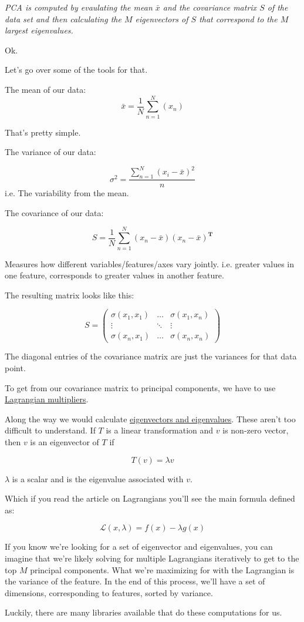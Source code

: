\documentclass[letterpaper,12pt]{article}
\begin{document}
\emph{PCA is computed by evaulating the mean $\bar{x}$ and the
covariance matrix $S$ of the data set and then calculating the $M$ eigenvectors
of $S$ that correspond to the $M$ largest eigenvalues.}

Ok.

Let's go over some of the tools for that.

The mean of our data:
\[
    \bar{x} = \frac{1}{N}\sum_{n=1}^{N}(x_n)
\]

That's pretty simple.

The variance of our data:

\[
    \sigma^2 = \frac{\sum_{n=1}^{N} (x_i - \bar{x})^2}{n}
\]
i.e. The variability from the mean.

The covariance of our data:

\[
    S = \frac{1}{N} \sum_{n=1}^{N} (x_n - \bar{x})(x_n - \bar{x})^{\textbf{T}}
\]

Measures how different variables/features/axes vary jointly. i.e. greater values
in one feature, corresponds to greater values in another feature.

The resulting matrix looks like this:

\[
S = \begin{pmatrix}
    \sigma(x_1, x_1) & \dots & \sigma(x_1, x_n)\\
    \vdots & \ddots & \vdots  \\
    \sigma(x_n, x_1)  & \dots & \sigma(x_n, x_n)
    \end{pmatrix}
\]

The diagonal entries of the covariance matrix are just the variances for that
data point.

To get from our covariance matrix to principal components, we have to use
\href{https://en.wikipedia.org/wiki/Lagrange_multiplier}{Lagrangian
multipliers}.

Along the way we would calculate \href{https://en.wikipedia.org/wiki/Eigenvalues_and_eigenvectors}{eigenvectors and eigenvalues}.
These aren't too difficult to understand. If $T$ is a linear transformation and
$v$ is non-zero vector, then $v$ is an eigenvector of $T$ if

\[
    T(v) = \lambda v
\]

$\lambda$ is a scalar and is the eigenvalue associated with $v$.

Which if you read the article on Lagrangians you'll see the main formula defined
as:

\[
    \mathcal{L}(x, \lambda) = f(x) - \lambda g(x)
\]

If you know we're looking for a set of eigenvector and eigenvalues, you can imagine
that we're likely solving for multiple Lagrangians iteratively to get to the top
$M$ principal components. What we're maximizing for with the Lagrangian is the
variance of the feature. In the end of this process, we'll have a set of
dimensions, corresponding to features, sorted by variance.

Luckily, there are many libraries available that do these computations for us.
\end{document}
